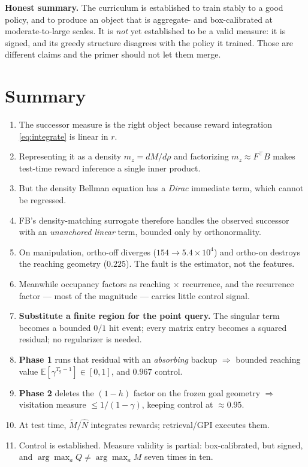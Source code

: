 \documentclass[11pt]{article}
\newcommand{\E}{\mathbb{E}}
\begin{document}
\begin{keybox}
\textbf{Honest summary.} The curriculum is established to train stably to a good
policy, and to produce an object that is aggregate- and box-calibrated at
moderate-to-large scales. It is \emph{not} yet established to be a valid measure:
it is signed, and its greedy structure disagrees with the policy it trained. Those
are different claims and the primer should not let them merge.
\end{keybox}

\section{Summary}

\begin{enumerate}[leftmargin=1.6em]
\item The successor measure is the right object because reward integration
      \eqref{eq:integrate} is linear in $r$.
\item Representing it as a density $m_z = dM/d\rho$ and factorizing
      $m_z \approx F^\top B$ makes test-time reward inference a single inner product.
\item But the density Bellman equation has a \emph{Dirac} immediate term, which
      cannot be regressed.
\item FB's density-matching surrogate therefore handles the observed successor with
      an \emph{unanchored linear} term, bounded only by orthonormality.
\item On manipulation, ortho-off diverges ($154\to5.4\times10^4$) and ortho-on
      destroys the reaching geometry ($0.225$). The fault is the estimator, not
      the features.
\item Meanwhile occupancy factors as reaching $\times$ recurrence, and the
      recurrence factor --- most of the magnitude --- carries little control signal.
\item \textbf{Substitute a finite region for the point query.} The singular term
      becomes a bounded $0/1$ hit event; every matrix entry becomes a squared
      residual; no regularizer is needed.
\item \textbf{Phase 1} runs that residual with an \emph{absorbing} backup
      $\Rightarrow$ bounded reaching value $\E[\gamma^{T_g-1}]\in[0,1]$, and $0.967$ control.
\item \textbf{Phase 2} deletes the $(1-h)$ factor on the frozen goal geometry
      $\Rightarrow$ visitation measure $\le 1/(1-\gamma)$, keeping control at $\approx0.95$.
\item At test time, $\tilde M/\hat N$ integrates rewards; retrieval/GPI executes them.
\item Control is established. Measure validity is partial: box-calibrated, but
      signed, and $\arg\max_a Q \ne \arg\max_a M$ seven times in ten.
\end{enumerate}
\end{document}
